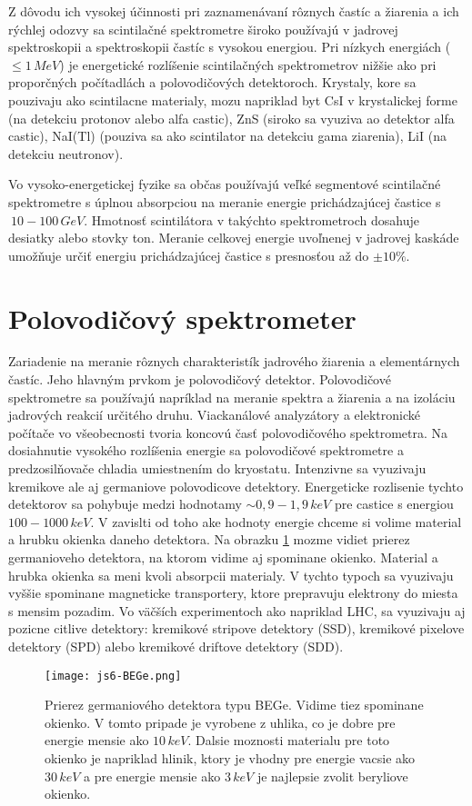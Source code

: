 \documentclass[../../main.tex]{subfiles}
\begin{document}
Z dôvodu ich vysokej účinnosti pri zaznamenávaní rôznych častíc a žiarenia a ich rýchlej odozvy sa scintilačné spektrometre široko používajú v jadrovej spektroskopii a spektroskopii častíc s vysokou energiou. Pri nízkych energiách ($\leq1\,MeV$) je energetické rozlíšenie scintilačných spektrometrov nižšie ako pri proporčných počítadlách a polovodičových detektoroch. Krystaly, kore sa pouzivaju ako scintilacne materialy, mozu napriklad byt CsI v krystalickej forme (na detekciu protonov alebo alfa castic), ZnS (siroko sa vyuziva ao detektor alfa castic), NaI(Tl) (pouziva sa ako scintilator na detekciu gama ziarenia), LiI (na detekciu neutronov).\par
Vo vysoko-energetickej fyzike sa občas používajú veľké segmentové scintilačné spektrometre s úplnou absorpciou na meranie energie prichádzajúcej častice s $~10-100\,GeV$. Hmotnosť scintilátora v takýchto spektrometroch dosahuje desiatky alebo stovky ton. Meranie celkovej energie uvoľnenej v jadrovej kaskáde umožňuje určiť energiu prichádzajúcej častice s presnosťou až do $\pm10\%$.

\section{Polovodičový spektrometer}
Zariadenie na meranie rôznych charakteristík jadrového žiarenia a elementárnych častíc. Jeho hlavným prvkom je polovodičový detektor. Polovodičové spektrometre sa používajú napríklad na meranie spektra a  žiarenia a na izoláciu jadrových reakcií určitého druhu. Viackanálové analyzátory a elektronické počítače vo všeobecnosti tvoria koncovú časť polovodičového spektrometra. Na dosiahnutie vysokého rozlíšenia energie sa polovodičové spektrometre a predzosilňovače chladia umiestnením do kryostatu. Intenzivne sa vyuzivaju kremikove ale aj germaniove polovodicove detektory. Energeticke rozlisenie tychto detektorov sa pohybuje medzi hodnotamy $\sim 0,9-1,9\,keV$ pre castice s energiou $100-1000\,keV$. V zavislti od toho ake hodnoty energie chceme si volime material a hrubku okienka daneho detektora. Na obrazku \ref{js6:fig:BEGe}
mozme vidiet prierez germanioveho detektora, na ktorom vidime aj spominane okienko. Material a hrubka okienka sa meni kvoli absorpcii materialy. V tychto typoch sa vyuzivaju vyššie spominane magneticke transportery, ktore prepravuju elektrony do miesta s mensim pozadim. Vo väčších experimentoch ako napriklad LHC, sa vyuzivaju aj pozicne citlive detektory: kremikové stripove detektory (SSD), kremikové pixelove detektory (SPD) alebo kremikové driftove detektory (SDD).
\begin{figure}[!h]
\centering
\texttt{[image: js6-BEGe.png]}
\caption{Prierez germaniového detektora typu BEGe. Vidime tiez spominane okienko. V tomto pripade je vyrobene z uhlika, co je dobre pre energie mensie ako $10\,keV$. Dalsie moznosti materialu pre toto okienko je napriklad hlinik, ktory je vhodny pre energie vacsie ako $30\,keV$ a pre energie mensie ako $3\,keV$ je najlepsie zvolit beryliove okienko.}
\label{js6:fig:BEGe}
\end{figure}\par
\end{document}
